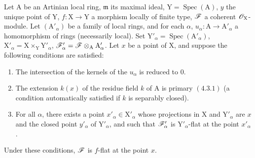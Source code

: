 \begin{proposition}[11.4.11]
\label{IV.11.4.11}
Let $\mathrm{A}$ be an Artinian local ring, $\mathfrak{m}$ its maximal ideal,
$\mathrm{Y}=\operatorname{Spec}(\mathrm{A})$, $y$ the unique point of $\mathrm{Y}$, $f:\mathrm{X}\to\mathrm{Y}$ a morphism locally of finite type, $\mathscr{F}$ a
coherent $\mathscr{O}_\mathrm{X}$-module. Let $(\mathrm{A}'_\alpha)$ be a family of local rings, and for each $\alpha$, $u_\alpha:\mathrm{A}\to\mathrm{A}'_\alpha$
a homomorphism of rings (necessarily local). Set $\mathrm{Y}'_\alpha=\operatorname{Spec}(\mathrm{A}'_\alpha)$, $\mathrm{X}'_\alpha=\mathrm{X}\times_\mathrm{Y}\mathrm{Y}'_\alpha$,
$\mathscr{F}'_\alpha=\mathscr{F}\otimes_\mathrm{A}\mathrm{A}'_\alpha$. Let $x$ be a point
of $\mathrm{X}$, and suppose the following conditions are satisfied:
\begin{enumerate}[label=(\roman*)]
  \item The intersection of the kernels of the $u_\alpha$ is reduced to $0$.
  \item The extension $k(x)$ of the residue field $k$ of $\mathrm{A}$ is primary $(4.3.1)$ (a condition automatically
  satisfied if $k$ is separably closed).
\end{enumerate}
\begin{enumerate}[label=(\roman*)]
  \setcounter{enumi}{2}
  \item For all $\alpha$, there exists a point $x'_\alpha\in\mathrm{X}'_\alpha$ whose projections in $\mathrm{X}$ and $\mathrm{Y}'_\alpha$
  are $x$ and the closed point $y'_\alpha$ of $\mathrm{Y}'_\alpha$, and such that $\mathscr{F}'_\alpha$ is $\mathrm{Y}'_\alpha$-flat at the point $x'_\alpha$.
\end{enumerate}

Under these conditions, $\mathscr{F}$ is $f$-flat at the point $x$.
\end{proposition}

